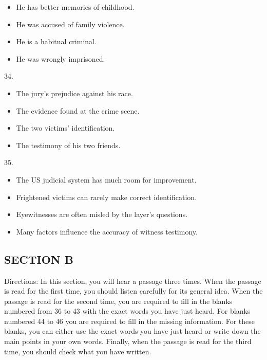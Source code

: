\documentclass[UTF8,11pt]{ctexart}
\begin{document}
\begin{itemize}[leftmargin=2em,itemsep=.2em,topsep=.4em]\item[A.] He has better memories of childhood.
\item[B.] He was accused of family violence.
\item[C.] He is a habitual criminal.
\item[D.] He was wrongly imprisoned.
\end{itemize}

34.


\begin{itemize}[leftmargin=2em,itemsep=.2em,topsep=.4em]\item[A.] The jury’s prejudice against his race.
\item[B.] The evidence found at the crime scene.
\item[C.] The two victims’ identification.
\item[D.] The testimony of his two friends.
\end{itemize}

35.


\begin{itemize}[leftmargin=2em,itemsep=.2em,topsep=.4em]\item[A.] The US judicial system has much room for improvement.
\item[B.] Frightened victims can rarely make correct identification.
\item[C.] Eyewitnesses are often misled by the layer’s questions.
\item[D.] Many factors influence the accuracy of witness testimony.
\end{itemize}

\subsection*{\textbf{SECTION B}}


Directions: In this section, you will hear a passage three times. When the passage is read for the first time, you should listen carefully for its general idea. When the passage is read for the second time, you are required to fill in the blanks numbered from 36 to 43 with the exact words you have just heard. For blanks numbered 44 to 46 you are required to fill in the missing information. For these blanks, you can either use the exact words you have just heard or write down the main points in your own words. Finally, when the passage is read for the third time, you should check what you have written.
\end{document}
